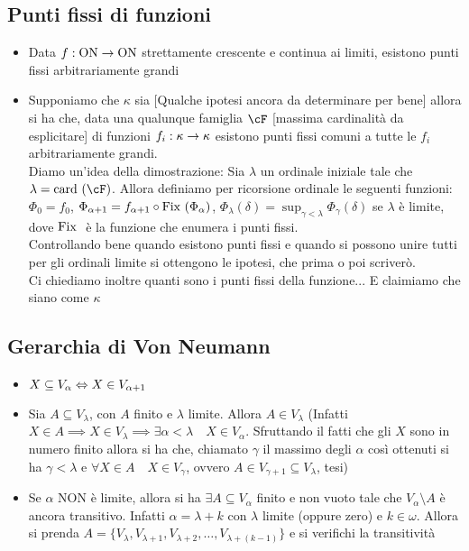 \documentclass[a4paper,NoNotes,GeneralMath]{stdmdoc}
\newcommand{\card}[1]{\text{card }({#1})}
\newcommand{\ON}{\text{ON}}
\begin{document}
	\subsection*{Punti fissi di funzioni}
	\begin{itemize}
		\item Data $f: \ON \rar \ON$ strettamente crescente e continua ai limiti, esistono punti fissi arbitrariamente grandi
		\item Supponiamo che $\kappa$ sia [Qualche ipotesi ancora da determinare per bene] allora si ha che, data una qualunque famiglia $\cF$ [massima cardinalità da esplicitare] di funzioni $f_i: \kappa \rightarrow \kappa$ esistono punti fissi comuni a tutte le $f_i$ arbitrariamente grandi. \\
			Diamo un'idea della dimostrazione: Sia $\lambda$ un ordinale iniziale tale che $\lambda = \card{\cF}$. Allora definiamo per ricorsione ordinale le seguenti funzioni: $\Phi_0 = f_0$, $\Phi_{\alpha + 1} = f_{\alpha + 1} \circ \mbox{Fix }(\Phi_\alpha)$, $\Phi_\lambda (\delta) = \sup_{\gamma < \lambda} \Phi_{\gamma}(\delta) $ se $\lambda$ è limite, dove $\mbox{Fix }$ è la funzione che enumera i punti fissi. \\
			Controllando bene quando esistono punti fissi e quando si possono unire tutti per gli ordinali limite si ottengono le ipotesi, che prima o poi scriverò. \\
			Ci chiediamo inoltre quanti sono i punti fissi della funzione... E claimiamo che siano come $\kappa$
	\end{itemize}
	
	\subsection*{Gerarchia di Von Neumann}
	\begin{itemize}
		\item $X \subseteq V_\alpha \Leftrightarrow X \in V_{\alpha + 1}$
		\item Sia $A \subseteq V_\lambda$, con $A$ finito e $\lambda$ limite. Allora $A \in V_\lambda$ (Infatti $X \in A \implies X \in V_\lambda \implies \exists \alpha < \lambda \quad X \in V_\alpha$. Sfruttando il fatti che gli $X$ sono in numero finito allora si ha che, chiamato $\gamma$ il massimo degli $\alpha$ così ottenuti si ha $\gamma < \lambda$ e $\forall X \in A \quad X \in V_\gamma$, ovvero $A \in V_{\gamma + 1} \subseteq V_\lambda$, tesi)
		\item Se $\alpha$ NON è limite, allora si ha $\exists A \subseteq V_{\alpha}$ finito e non vuoto tale che $V_\alpha \setminus A$ è ancora transitivo. Infatti $\alpha = \lambda + k$ con $\lambda$ limite (oppure zero) e $k \in \omega$. Allora si prenda $A = \{V_\lambda, V_{\lambda + 1}, V_{\lambda + 2}, \ldots, V_{\lambda + (k - 1)} \}$ e si verifichi la transitività
	\end{itemize}
	
\end{document}
